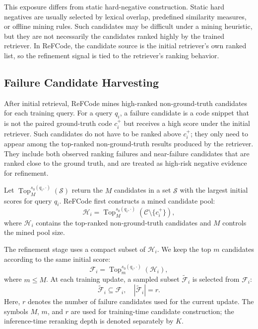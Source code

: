 \documentclass[10pt,conference]{IEEEtran}
\newcommand{\method}{ReFCode}
\begin{document}
This exposure differs from static hard-negative construction. Static hard negatives are usually selected by lexical overlap, predefined similarity measures, or offline mining rules. Such candidates may be difficult under a mining heuristic, but they are not necessarily the candidates ranked highly by the trained retriever. In \method{}, the candidate source is the initial retriever's own ranked list, so the refinement signal is tied to the retriever's ranking behavior.

\subsection{Failure Candidate Harvesting}
\label{sec:failure_candidate_harvesting}

After initial retrieval, \method{} mines high-ranked non-ground-truth candidates for each training query. For a query \(q_i\), a failure candidate is a code snippet that is not the paired ground-truth code \(c_i^+\) but receives a high score under the initial retriever. Such candidates do not have to be ranked above \(c_i^+\); they only need to appear among the top-ranked non-ground-truth results produced by the retriever. They include both observed ranking failures and near-failure candidates that are ranked close to the ground truth, and are treated as high-risk negative evidence for refinement.

Let \(\operatorname{Top}_{M}^{s_0(q_i,\cdot)}(\mathcal{S})\) return the \(M\) candidates in a set \(\mathcal{S}\) with the largest initial scores for query \(q_i\). \method{} first constructs a mined candidate pool:
\begin{equation}
    \mathcal{H}_i =
    \operatorname{Top}_{M}^{s_0(q_i,\cdot)}
    (\mathcal{C}\setminus\{c_i^+\}),
\end{equation}
where \(\mathcal{H}_i\) contains the top-ranked non-ground-truth candidates and \(M\) controls the mined pool size.

The refinement stage uses a compact subset of \(\mathcal{H}_i\). We keep the top \(m\) candidates according to the same initial score:
\begin{equation}
    \mathcal{F}_i =
    \operatorname{Top}_{m}^{s_0(q_i,\cdot)}(\mathcal{H}_i),
\end{equation}
where \(m\leq M\). At each training update, a sampled subset \(\widetilde{\mathcal{F}}_i\) is selected from \(\mathcal{F}_i\):
\begin{equation}
    \widetilde{\mathcal{F}}_i \subseteq \mathcal{F}_i,
    \quad |\widetilde{\mathcal{F}}_i|=r.
\end{equation}
Here, \(r\) denotes the number of failure candidates used for the current update. The symbols \(M\), \(m\), and \(r\) are used for training-time candidate construction; the inference-time reranking depth is denoted separately by \(K\).
\end{document}
